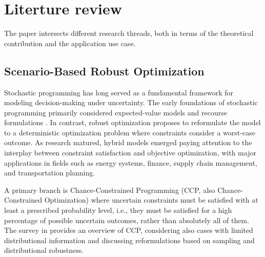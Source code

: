 \documentclass[preprint,11pt,authoryear]{elsarticle}
\begin{document}

\section{Literture review} \label{Sec:literature}

The paper intersects different research threads, both in terms of the theoretical contribution and the application use case.

\subsection{Scenario-Based Robust Optimization}

Stochastic programming has long served as a fundamental framework for modeling decision-making under uncertainty. The early foundations of stochastic programming primarily considered expected-value models and recourse formulations \cite{B55,D55}. In contrast, robust optimization \cite{BN98,BS04} proposes to reformulate the model to a deterministic optimization problem where constraints consider a worst-case outcome. As research matured, hybrid models emerged paying attention to the interplay between constraint satisfaction and objective optimization, with major applications in fields such as energy systems, finance, supply chain management, and transportation planning.

A primary branch is Chance-Constrained Programming (CCP, also Chance-Constrained Optimization) \cite{CC59,P95} where uncertain constraints must be satisfied with at least a prescribed probability level, i.e., they must be satisfied for a high percentage of possible uncertain outcomes, rather than absolutely all of them. The survey in \cite{KJ22} provides an overview of CCP, considering also cases with limited distributional information and discussing reformulations based on sampling and distributional robustness.
\end{document}
